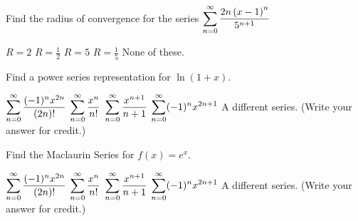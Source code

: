 \documentclass[12pt]{exam}
\newcommand{\ds}{\ensuremath{\displaystyle}}
\begin{document}
\begin{questions}

\setcounter{question}{0}
\question[10]
Find the radius of convergence for the series
$\ds \sum_{n=0}^{\infty} \frac{2n\left(x-1\right)^n}{5^{n+1}}$

\begin{checkboxes}
\choice $R=2$
\choice $R=\frac{1}{2}$
\CorrectChoice $R=5$
\choice $R=\frac{1}{5}$
\choice None of these.
\end{checkboxes}

\vfill

\question[10]
Find a power series representation for $\ln\left(1+x\right)$.

\begin{checkboxes}
\choice $\ds\sum_{n=0}^\infty \frac{(-1)^nx^{2n}}{(2n)!}$
\choice $\ds\sum_{n=0}^\infty \frac{x^n}{n!}$
\CorrectChoice $\ds\sum_{n=0}^\infty \frac{x^{n+1}}{n+1}$
\choice $\ds\sum_{n=0}^\infty (-1)^nx^{2n+1}$
\choice A different series. (Write your answer for credit.)
\end{checkboxes}

\vfill

\question[5]
Find the Maclaurin Series for $f(x) = e^x$.

\begin{checkboxes}
\choice $\ds\sum_{n=0}^\infty \frac{(-1)^nx^{2n}}{(2n)!}$
\CorrectChoice $\ds\sum_{n=0}^\infty \frac{x^n}{n!}$
\choice $\ds\sum_{n=0}^\infty \frac{x^{n+1}}{n+1}$
\choice $\ds\sum_{n=0}^\infty (-1)^nx^{2n+1}$
\choice A different series. (Write your answer for credit.)
\end{checkboxes}

\vfill

\end{questions}
\end{document}
